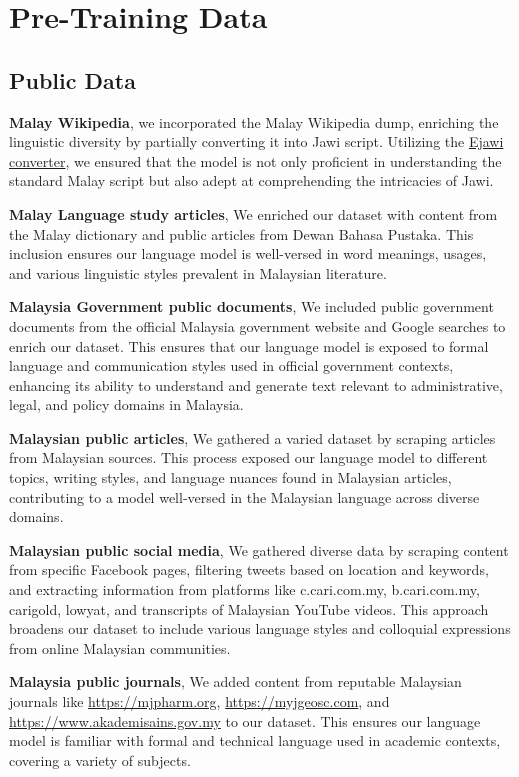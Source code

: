 \documentclass[preprint]{article}
\begin{document}
\section{Pre-Training Data}

\subsection{Public Data}\label{sec:public-data}

\textbf{Malay Wikipedia}, we incorporated the Malay Wikipedia dump, enriching the linguistic diversity by partially converting it into Jawi script. Utilizing the \href{https://www.ejawi.net/converterV2.php?go=rumi}{Ejawi converter}, we ensured that the model is not only proficient in understanding the standard Malay script but also adept at comprehending the intricacies of Jawi.

\textbf{Malay Language study articles}, We enriched our dataset with content from the Malay dictionary and public articles from Dewan Bahasa Pustaka. This inclusion ensures our language model is well-versed in word meanings, usages, and various linguistic styles prevalent in Malaysian literature.

\textbf{Malaysia Government public documents}, We included public government documents from the official Malaysia government website and Google searches to enrich our dataset. This ensures that our language model is exposed to formal language and communication styles used in official government contexts, enhancing its ability to understand and generate text relevant to administrative, legal, and policy domains in Malaysia.

\textbf{Malaysian public articles}, We gathered a varied dataset by scraping articles from Malaysian sources. This process exposed our language model to different topics, writing styles, and language nuances found in Malaysian articles, contributing to a model well-versed in the Malaysian language across diverse domains.

\textbf{Malaysian public social media}, We gathered diverse data by scraping content from specific Facebook pages, filtering tweets based on location and keywords, and extracting information from platforms like c.cari.com.my, b.cari.com.my, carigold, lowyat, and transcripts of Malaysian YouTube videos. This approach broadens our dataset to include various language styles and colloquial expressions from online Malaysian communities.

\textbf{Malaysia public journals}, We added content from reputable Malaysian journals like \url{https://mjpharm.org}, \url{https://myjgeosc.com}, and \url{https://www.akademisains.gov.my} to our dataset. This ensures our language model is familiar with formal and technical language used in academic contexts, covering a variety of subjects.
\end{document}
